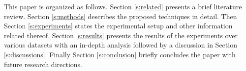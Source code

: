 This paper is organized as follows. Section \ref{s:related} presents a brief literature review. Section \ref{s:methods} describes the proposed techniques in detail. Then Section \ref{s:experiments} states the experimental setup and other information related thereof. Section \ref{s:results} presents the results of the experiments over various datasets with an in-depth analysis followed by a discussion in Section \ref{s:discussions}. Finally Section \ref{s:conclusion} briefly concludes the paper with future research directions.

